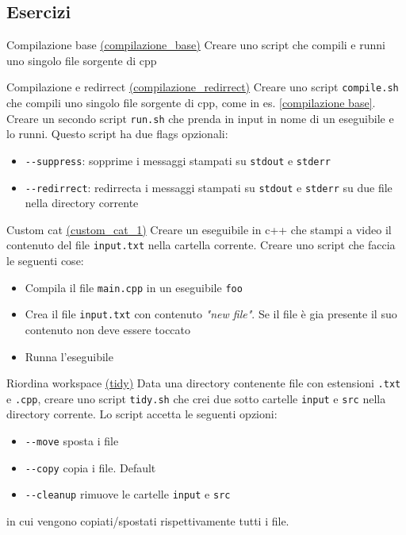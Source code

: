 \subsection{Esercizi}
\begin{esercizio}{Compilazione base  \href{run:./files/linux/compilazione_base/}{(compilazione\_base)}}
	Creare uno script che compili e runni uno singolo file sorgente di cpp
\end{esercizio} \label{compilazione base}
\begin{esercizio}{Compilazione e redirrect \href{run:./files/linux/compilazione_redirrect/}{(compilazione\_redirrect)}}
	Creare uno script \verb|compile.sh| che compili uno singolo file sorgente di cpp, come in es. \ref{compilazione base}. Creare un secondo script \verb|run.sh| che prenda in input in nome di un eseguibile e lo runni. Questo script ha due flags opzionali:
	\begin{itemize}
		\item \verb|--suppress|: sopprime i messaggi stampati su \verb|stdout| e \verb|stderr|
		\item \verb|--redirrect|: redirrecta i messaggi stampati su \verb|stdout| e \verb|stderr| su due file nella directory corrente
	\end{itemize}
\end{esercizio}
\begin{esercizio}{Custom cat \href{run:./files/linux/custom_cat_1/}{(custom\_cat\_1)}}
	Creare un eseguibile in c++ che stampi a video il contenuto del file \verb|input.txt| nella cartella corrente. Creare uno script che faccia le seguenti cose:
	\begin{itemize}
		\item Compila il file \verb|main.cpp| in un eseguibile \verb|foo|
		\item Crea il file \verb|input.txt| con contenuto \textit{"new file"}. Se il file è gia presente il suo contenuto non deve essere toccato
		\item Runna l'eseguibile
	\end{itemize}
\end{esercizio}
\begin{esercizio}{Riordina workspace \href{run:./files/linux/tidy/}{(tidy)}}
	Data una directory contenente file con estensioni \verb|.txt| e \verb|.cpp|, creare uno script \verb|tidy.sh| che crei due sotto cartelle \verb|input| e \verb|src| nella directory corrente. Lo script accetta le seguenti opzioni:
	\begin{itemize}
		\item \verb|--move| sposta i file
		\item \verb|--copy| copia i file. Default
		\item \verb|--cleanup| rimuove le cartelle \verb|input| e \verb|src|
	\end{itemize}
	in cui vengono copiati/spostati rispettivamente tutti i file.
\end{esercizio}

